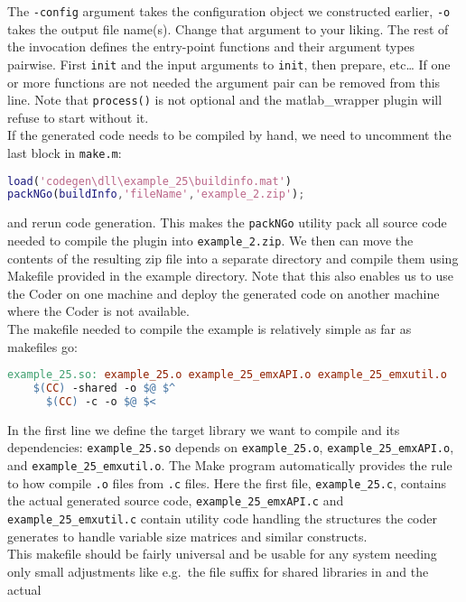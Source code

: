 \documentclass[11pt,a4paper,twoside]{article}
\newcommand{\+}{\discretionary{\mbox{\scriptsize$\hookleftarrow$}}{}{}}
\begin{document}
The \texttt{-config} argument takes the configuration object we constructed
earlier, \texttt{-o} takes the output file name(s). Change that argument to your liking.
The rest of the invocation defines the entry-point functions and their argument
types pairwise. First \texttt{init} and the input arguments to \texttt{init},
then prepare, etc\ldots
If one or more functions are not needed the argument pair can be removed from
this line. Note that \texttt{process()} is not optional and the matlab\_wrapper
plugin will refuse to start without it. \\
If the generated code needs to be compiled by hand, we need to uncomment the
last block in \texttt{make.m}:
\begin{lstlisting}[language=Matlab]
%% Optionally package the code for deployment elsewhere
load('codegen\dll\example_25\buildinfo.mat')
packNGo(buildInfo,'fileName','example_2.zip');
\end{lstlisting}
and rerun code generation. This makes the \texttt{packNGo} utility pack all
source code needed to compile the plugin into \texttt{example\_2.zip}.
We then can move the contents of the resulting zip file into a separate
directory and compile them using Makefile provided in the example directory.
Note that this also enables us to use the \Matlab{} Coder on one machine and deploy
the generated code on another machine where the Coder is not available. \\
The makefile needed to compile the example is relatively simple as far as
makefiles go:
\begin{lstlisting}[language=make]
  example_25.so: example_25.o example_25_emxAPI.o example_25_emxutil.o
    $(CC) -shared -o $@ $^
      $(CC) -c -o $@ $<
\end{lstlisting}
In the first line we define the target library we want to compile and its dependencies:
\texttt{example\_25.so} depends on \texttt{example\_25.o}, \texttt{example\_25\_emxAPI.o}, 
and \texttt{example\_25\_emxutil.o}. The Make program automatically provides the rule 
to how compile \texttt{.o} files from \texttt{.c} files.
Here the first file, \texttt{example\_25.c}, contains the actual
generated source code, \texttt{example\_25\_emxAPI.c} and
\texttt{example\_25\_emxutil.c} contain utility code handling the structures the
\Matlab{} coder generates to handle variable size matrices and similar
constructs. \\
This makefile should be fairly universal and be usable for any system needing only 
small adjustments like e.g.\ the file suffix for shared libraries in and the actual 
\end{document}
